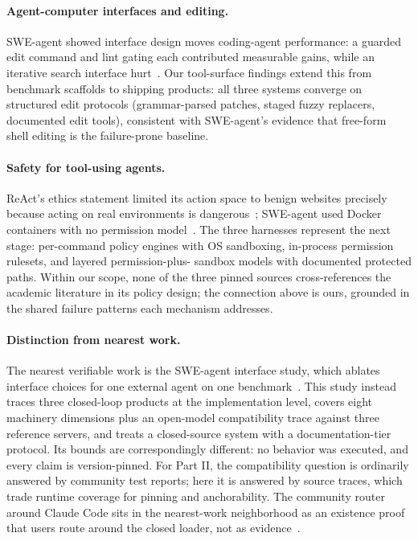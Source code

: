 \documentclass{article}
\newcommand{\ccc}[0]{Claude Code}
\begin{document}
\paragraph{Agent-computer interfaces and editing.} SWE-agent showed
interface design moves coding-agent performance: a guarded edit command and
lint gating each contributed measurable gains, while an iterative search
interface hurt~\citep{yang2024sweagent}. Our tool-surface findings extend
this from benchmark scaffolds to shipping products: all three systems
converge on structured edit protocols (grammar-parsed patches, staged
fuzzy replacers, documented edit tools), consistent with SWE-agent's
evidence that free-form shell editing is the failure-prone baseline.

\paragraph{Safety for tool-using agents.} ReAct's ethics statement limited
its action space to benign websites precisely because acting on real
environments is dangerous~\citep{yao2023react}; SWE-agent used Docker
containers with no permission model~\citep{yang2024sweagent}. The three
harnesses represent the next stage: per-command policy engines with OS
sandboxing, in-process permission rulesets, and layered permission-plus-
sandbox models with documented protected paths. Within our scope, none of
the three pinned sources cross-references the academic literature in its
policy design; the connection above is ours, grounded in the shared
failure patterns each mechanism addresses.

\paragraph{Distinction from nearest work.} The nearest verifiable work is
the SWE-agent interface study, which ablates interface choices for one
external agent on one benchmark~\citep{yang2024sweagent}. This study
instead traces three closed-loop products at the implementation level,
covers eight machinery dimensions plus an open-model compatibility trace
against three reference servers, and treats a closed-source system with a
documentation-tier protocol. Its bounds are correspondingly different:
no behavior was executed, and every claim is version-pinned. For Part II,
the compatibility question is ordinarily answered by community test
reports; here it is answered by source traces, which trade runtime
coverage for pinning and anchorability. The community router around
\ccc{} sits in the nearest-work neighborhood as an existence proof that
users route around the closed loader, not as
evidence~\citep{claudeCodeRouterContext}.
\end{document}

